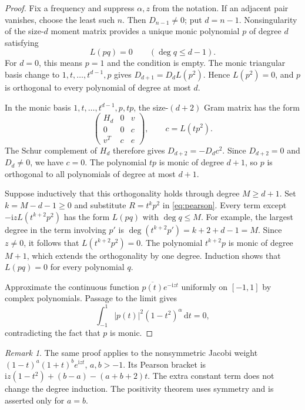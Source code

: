 \documentclass[11pt]{article}
\numberwithin{equation}{section}
\theoremstyle{remark}
\newtheorem{remark}[theorem]{Remark}
\newcommand{\ii}{\mathrm{i}}
\newcommand{\dd}{\,\mathrm{d}}
\begin{document}
\begin{proof}
Fix a frequency and suppress $\alpha,z$ from the notation. If an adjacent
pair vanishes, choose the least such $n$. Then $D_{n-1}\ne0$; put
$d=n-1$. Nonsingularity of the size-$d$ moment matrix provides a unique
monic polynomial $p$ of degree $d$ satisfying
\begin{equation}\label{eq:orthstart}
                         L(pq)=0\qquad(\deg q\le d-1).
\end{equation}
For $d=0$, this means $p=1$ and the condition is empty. The monic
triangular basis change to $1,t,\ldots,t^{d-1},p$ gives
$D_{d+1}=D_dL(p^2)$. Hence $L(p^2)=0$, and $p$ is orthogonal to every
polynomial of degree at most $d$.

In the monic basis $1,t,\ldots,t^{d-1},p,tp$, the size-$(d+2)$ Gram
matrix has the form
\[
 \begin{pmatrix}
  H_d&0&v\\
  0&0&c\\
  v^{T}&c&e
 \end{pmatrix},\qquad c=L(tp^2).
\]
The Schur complement of $H_d$ therefore gives
$D_{d+2}=-D_dc^2$. Since $D_{d+2}=0$ and $D_d\ne0$, we have $c=0$.
The polynomial $tp$ is monic of degree $d+1$, so $p$ is orthogonal to
all polynomials of degree at most $d+1$.

Suppose inductively that this orthogonality holds through degree
$M\ge d+1$. Set $k=M-d-1\ge0$ and substitute $R=t^kp^2$ in
\eqref{eq:pearson}. Every term except
$-\ii zL(t^{k+2}p^2)$ has the form $L(pq)$ with $\deg q\le M$.
For example, the largest degree in the term involving $p'$ is
$\deg(t^{k+2}p')=k+2+d-1=M$. Since $z\ne0$, it follows that
$L(t^{k+2}p^2)=0$. The polynomial $t^{k+2}p$ is monic of degree
$M+1$, which extends the orthogonality by one degree. Induction shows
that $L(pq)=0$ for every polynomial $q$.

Approximate the continuous function $\overline{p(t)}e^{-\ii zt}$
uniformly on $[-1,1]$ by complex polynomials. Passage to the limit gives
\[
                       \int_{-1}^1|p(t)|^2(1-t^2)^\alpha\dd t=0,
\]
contradicting the fact that $p$ is monic.
\end{proof}

\begin{remark}\label{rem:jacobi}
The same proof applies to the nonsymmetric Jacobi weight
$(1-t)^a(1+t)^b e^{\ii zt}$, $a,b>-1$. Its Pearson bracket is
$\ii z(1-t^2)+(b-a)-(a+b+2)t$. The extra constant term does not change
the degree induction. The positivity theorem uses symmetry and is
asserted only for $a=b$.
\end{remark}
\end{document}
